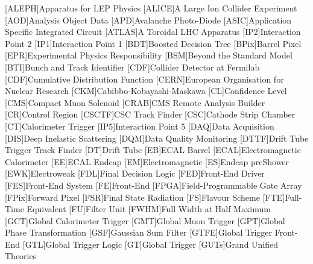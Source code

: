 \begin{acronym}
  [ALEPH]{Apparatus for LEP Physics}
  [ALICE]{A Large Ion Collider Experiment}
  [AOD]{Analysis Object Data}
  [APD]{Avalanche Photo-Diode}
  [ASIC]{Application Specific Integrated Circuit}
  [ATLAS]{A Toroidal LHC Apparatus}
  [IP2]{Interaction Point 2}
  [IP1]{Interaction Point 1}
  [BDT]{Boosted Decision Tree}
  [BPix]{Barrel Pixel}
  [EPR]{Experimental Physics Responsibility}%
  [BSM]{Beyond the Standard Model}
  [BTI]{Bunch and Track Identifier}
  [CDF]{Collider Detector at Fermilab }
  [CDF]{Cumulative Distribution Function}
  [CERN]{European Organisation for Nuclear Research}
  [CKM]{Cabibbo-Kobayashi-Maskawa}
  [CL]{Confidence Level}
  [CMS]{Compact Muon Solenoid}
  [CRAB]{CMS Remote Analysis Builder}
  [CR]{Control Region}
  [CSCTF]{CSC Track Finder}
  [CSC]{Cathode Strip Chamber}
  [CT]{Calorimeter Trigger}
  [IP5]{Interaction Point 5}
  [DAQ]{Data Acquisition}
  [DIS]{Deep Inelastic Scattering}
  [DQM]{Data Quality Monitoring}
  [DTTF]{Drift Tube Trigger Track Finder}
  [DT]{Drift Tube}
  [EB]{ECAL Barrel}
  [ECAL]{Electromagnetic Calorimeter}
  [EE]{ECAL Endcap}
  [EM]{Electromagnetic}
  [ES]{Endcap preShower}
  [EWK]{Electroweak}
  [FDL]{Final Decision Logic}
  [FED]{Front-End Driver}
  [FES]{Front-End System}
  [FE]{Front-End}
  [FPGA]{Field-Programmable Gate Array}
  [FPix]{Forward Pixel}
  [FSR]{Final State Radiation}
  [FS]{Flavour Scheme} 
  [FTE]{Full-Time Equivalent}
  [FU]{Filter Unit}
  [FWHM]{Full Width at Half Maximum}
  [GCT]{Global Calorimeter Trigger}
  [GMT]{Global Muon Trigger}
  [GPT]{Global Phase Transformation}
  [GSF]{Gaussian Sum Filter}
  [GTFE]{Global Trigger Front-End}
  [GTL]{Global Trigger Logic}
  [GT]{Global Trigger}
  [GUTs]{Grand Unified Theories}

\end{acronym}

